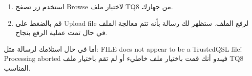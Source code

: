 \documentclass[a4paper,12pt]{article}
\begin{document}
\begin{enumerate}
\begin{figure}[!hbtp]
			\caption{صفحة \textenglish{LoTW} بعد اختيار تبويبة \textenglish{Upload File}}
			\label{fig:SignLoTW}
			\end{figure}
		  قم باختيار تبويبة \textenglish{Upload File} كما هو موضح في الشكل \ref{fig:SignLoTW}.
		\item
		  استخدم زر تصفح \textenglish{Browse} لاختيار ملف \textenglish{TQ8} من جهازك.
		\item
		  قم بالضغط على \textenglish{Upload file} لرفع الملف. ستظهر لك رسالة بأنه تتم معالجة الملف
		  في حال تمت عملية الرفع بنجاح.
	\end{enumerate}

أما في حال استلامك لرسالة مثل: \textenglish{FILE does not appear to be a
TrustedQSL file! Processing aborted} فيبدو أنك قمت باختيار ملف خاطيء أو لم تقم باختيار ملف \textenglish{TQ8} المناسب.

\vspace{24pt}
\begin{center}
	\color{slategray2}
{\Huge\hrulefill\hspace{0.2cm} \floweroneright\floweroneleft \hspace{0.2cm} \hrulefill}
\end{center}

\vspace{30pt}

\newpage
\listoffigures\newpage
\end{document}
